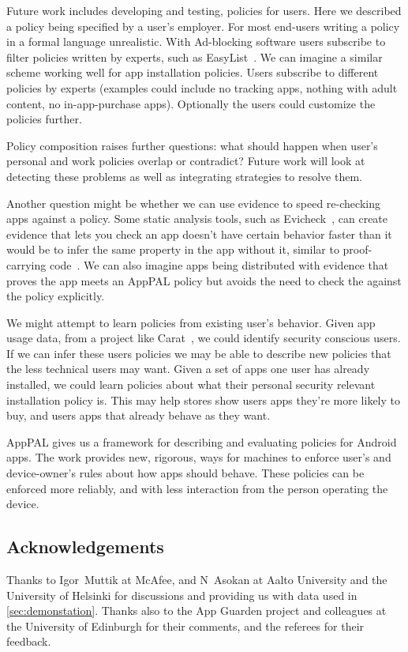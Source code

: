 \documentclass[]{llncs}
\begin{document}
Future work includes developing and testing, policies for users.
Here we described a policy being specified by a user's employer.
For most end-users writing a policy in a formal language unrealistic.
With Ad-blocking software users subscribe to filter policies written by experts, such as EasyList~\cite{Easylist}.
We can imagine a similar scheme working well for app installation policies.
Users subscribe to different policies by experts (examples could include no tracking apps, nothing with adult content, no in-app-purchase apps).
Optionally the users could customize the policies further.

Policy composition raises further questions: what should happen when user's
personal and work policies overlap or contradict?  
Future work will look at detecting these problems as well as integrating strategies to resolve them.

Another question might be whether we can use evidence to speed re-checking apps against a policy.
Some static analysis tools, such as Evicheck~\cite{Seghir:2015er}, can create evidence that lets you check an app doesn't have certain behavior faster than it would be to infer the same property in the app without it, similar to proof-carrying code~\cite{Necula:1996tr}.
We can also imagine apps being distributed with evidence that proves the app meets an AppPAL policy but avoids the need to check the against the policy explicitly.

We might attempt to learn policies from existing user's behavior.
Given app usage data, from a project like Carat~\cite{Oliner:2013ht}, we could identify security conscious users.
If we can infer these users policies we may be able to describe new policies that the less technical users may want.
Given a set of apps one user has already installed, we could learn policies about what their personal security relevant installation policy is.
This may help stores show users apps they're more likely to buy, and users apps that already behave as they want.

AppPAL gives us a framework for describing and evaluating policies for Android apps.
The work provides new, rigorous, ways for machines to enforce user's and device-owner's rules about how apps should behave.
These policies can be enforced more reliably, and with less interaction from the person operating the device.

\subsection*{Acknowledgements}

Thanks to Igor~Muttik at McAfee, and N~Asokan at Aalto University and the University of Helsinki for discussions and providing us with data used in \autoref{sec:demonstation}.
Thanks also to the App Guarden project and colleagues at the University of Edinburgh for their comments, and the referees for their feedback.



\end{document}
